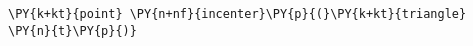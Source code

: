 \begin{Verbatim}[commandchars=\\\{\}]
    \PY{k+kt}{point} \PY{n+nf}{incenter}\PY{p}{(}\PY{k+kt}{triangle} \PY{n}{t}\PY{p}{)}
\end{Verbatim}
